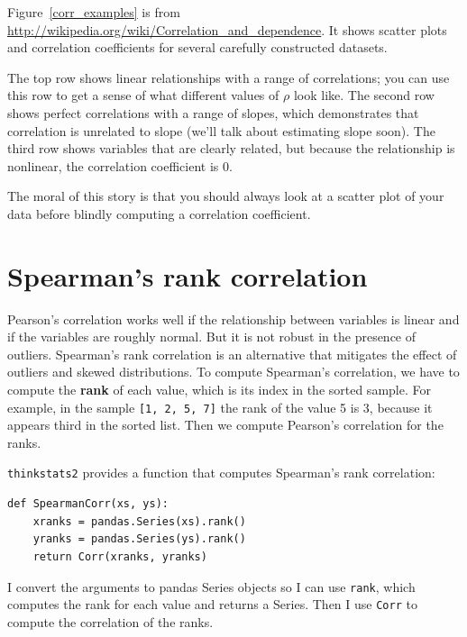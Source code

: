 Figure~\ref{corr_examples} is from
\url{http://wikipedia.org/wiki/Correlation_and_dependence}.  It shows
scatter plots and correlation coefficients for several
carefully constructed datasets.

The top row shows linear relationships with a range of correlations;
you can use this row to get a sense of what different values of
$\rho$ look like.  The second row shows perfect correlations with a
range of slopes, which demonstrates that correlation is unrelated to
slope (we'll talk about estimating slope soon).  The third row shows
variables that are clearly related, but because the relationship is
nonlinear, the correlation coefficient is 0.

The moral of this story is that you should always look at a scatter
plot of your data before blindly computing a correlation coefficient.


\section{Spearman's rank correlation}

Pearson's correlation works well if the relationship between variables
is linear and if the variables are roughly normal.  But it is not
robust in the presence of outliers.
Spearman's rank correlation is an alternative that mitigates the
effect of outliers and skewed distributions.  To compute Spearman's
correlation, we have to compute the {\bf rank} of each value, which is its
index in the sorted sample.  For example, in the sample {\tt [1, 2, 5, 7]}
the rank of the value 5 is 3, because it appears third in the sorted
list.  Then we compute Pearson's correlation for the ranks.

{\tt thinkstats2} provides a function that computes Spearman's rank
correlation:

\begin{verbatim}
def SpearmanCorr(xs, ys):
    xranks = pandas.Series(xs).rank()
    yranks = pandas.Series(ys).rank()
    return Corr(xranks, yranks)
\end{verbatim}

I convert the arguments to pandas Series objects so I can use
{\tt rank}, which computes the rank for each value and returns
a Series.  Then I use {\tt Corr} to compute the correlation
of the ranks.

